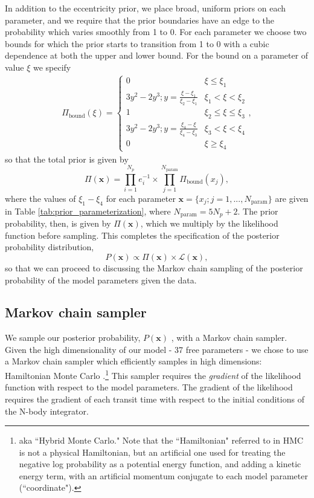 \documentclass[twocolumn]{aastex63}
\begin{document}
In addition to the eccentricity prior, we place broad, uniform priors on each parameter, and we require that
the prior boundaries have an edge to the probability which varies smoothly from 1 to 0.  For each parameter 
we choose two bounds for which the prior starts to transition from 1 to 0 with a cubic dependence at both
the upper and lower bound.  For the  bound on a parameter of value $\xi$ we specify
\begin{eqnarray}
\Pi_\mathrm{bound}(\xi) = 
\begin{cases}
0 &  \xi {\le} \xi_1\\
3y^2-2y^3; y = \frac{\xi-\xi_1}{\xi_2-\xi_1} & \xi_1 {<} \xi {<} \xi_2\\
1 & \xi_2 {\le} \xi {\le} \xi_3 \\
3y^2-2y^3; y = \frac{\xi_4-\xi}{\xi_4-\xi_3} & \xi_3{<} \xi {<} \xi_4\\
0 &  \xi {\ge} \xi_4
\end{cases},
\end{eqnarray}
so that the total prior is given by
\begin{equation}
    \Pi(\mathbf{x}) = \prod_{i=1}^{N_p} e_i^{-1} {\times} \prod_{j=1}^{N_\mathrm{param}} \Pi_\mathrm{bound}(x_j),
\end{equation}
where the values of $\xi_1{-}\xi_4$ for each parameter
$\mathbf{x} {=} \{x_j; j{=} 1,...,N_\mathrm{param}\}$ are given in Table
\ref{tab:prior_parameterization}, where $N_\mathrm{param} = 5 N_p + 2$.
The prior probability, then, is given by $\Pi(\mathbf{x})$, which we
multiply by the likelihood function before sampling.
This completes the specification of the posterior probability distribution, 
\begin{equation}
P(\mathbf{x}) \propto \Pi(\mathbf{x}) \times \mathcal{L}(\mathbf{x}),
\end{equation}
so that we can proceed to discussing the Markov chain sampling of the posterior probability of the model parameters given the data.

\subsection{Markov chain sampler}

We sample our posterior probability, $P(\mathbf{x})$ ,
with a Markov chain sampler.
Given the high dimensionality of our model - 37 free parameters - we chose to use
a Markov chain sampler which efficiently samples in high dimensions:  Hamiltonian
Monte Carlo \citep[HMC; ][]{Duane1987,Neal2011,Betancourt2017,Monnahan2016}.\footnote{aka ``Hybrid Monte Carlo." Note
that the ``Hamiltonian" referred to in HMC is not a physical Hamiltonian, but an
artificial one used for treating the negative log probability as a potential
energy function, and adding a kinetic energy term, with an artificial momentum conjugate
to each model parameter (``coordinate").}  This
sampler requires the {\it gradient} of the likelihood function with respect to
the model parameters.  The gradient of the likelihood requires the gradient
of each transit time with respect to the initial conditions of the N-body
integrator.
\end{document}
